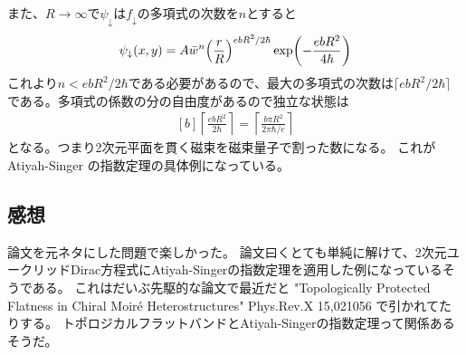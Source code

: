 \documentclass[../../sp_2015.tex]{subfiles}
\begin{document}
また、\(R\to\infty\)で\(\psi_\downarrow\)は\(f_\downarrow\)の多項式の次数を\(n\)とすると
\begin{equation}\begin{aligned}[b]
    \psi_\downarrow(x,y)= A\bar{w}^n\qty(\frac{r}{R})^{ebR^2/2\hbar}\exp(-\frac{ebR^2}{4\hbar})
\end{aligned}\end{equation}
これより\(n<ebR^2/2\hbar\)である必要があるので、最大の多項式の次数は\(\lceil ebR^2/2\hbar \rceil\)
である。多項式の係数の分の自由度があるので独立な状態は
\begin{equation}\begin{aligned}[b]
    \left\lceil \frac{ebR^2}{2\hbar} \right\rceil = \left\lceil \frac{b \pi R^2}{2\pi\hbar/e}\right\rceil
\end{aligned}\end{equation}
となる。つまり2次元平面を貫く磁束を磁束量子で割った数になる。
これが Atiyah-Singer の指数定理の具体例になっている。

\subsection*{感想}
論文を元ネタにした問題で楽しかった。
論文曰くとても単純に解けて、2次元ユークリッドDirac方程式にAtiyah-Singerの指数定理を適用した例になっているそうである。
これはだいぶ先駆的な論文で最近だと "Topologically Protected Flatness in Chiral Moir\'{e} Heterostructures" Phys.Rev.X 15,021056
で引かれてたりする。
トポロジカルフラットバンドとAtiyah-Singerの指数定理って関係あるそうだ。
\end{document}
